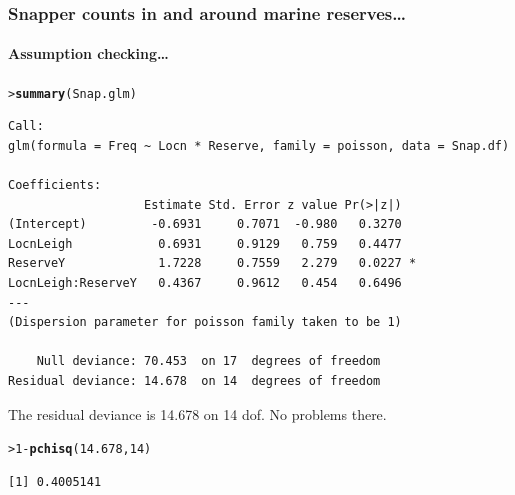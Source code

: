\documentclass{beamer}\usepackage[]{graphicx}\usepackage[]{xcolor}
\makeatletter
\newcommand{\hlnum}[1]{\textcolor[rgb]{0.686,0.059,0.569}{#1}}%
\newcommand{\hlopt}[1]{\textcolor[rgb]{0,0,0}{#1}}%
\newcommand{\hlstd}[1]{\textcolor[rgb]{0.345,0.345,0.345}{#1}}%
\newcommand{\hlkwd}[1]{\textcolor[rgb]{0.737,0.353,0.396}{\textbf{#1}}}%
\newenvironment{kframe}{%
 \def\at@end@of@kframe{}%
 \ifinner\ifhmode%
  \def\at@end@of@kframe{\end{minipage}}%
  \begin{minipage}{\columnwidth}%
 \fi\fi%
 \def\FrameCommand##1{\hskip\@totalleftmargin \hskip-\fboxsep
 \colorbox{shadecolor}{##1}\hskip-\fboxsep
     \hskip-\linewidth \hskip-\@totalleftmargin \hskip\columnwidth}%
 \MakeFramed {\advance\hsize-\width
   \@totalleftmargin\z@ \linewidth\hsize
   \@setminipage}}%
 {\par\unskip\endMakeFramed%
 \at@end@of@kframe}
\newenvironment{knitrout}{}{} %
\makeatother
\begin{document}
\begin{frame}[fragile]
\frametitle{Snapper counts in and around marine reserves\ldots}
\framesubtitle{Assumption checking\ldots}

\begin{knitrout}\scriptsize
{}\color{fgcolor}\begin{kframe}
\begin{alltt}
\hlstd{> }\hlkwd{summary}\hlstd{(Snap.glm)}
\end{alltt}
\end{kframe}
\end{knitrout}

\begin{knitrout}\scriptsize
{}\color{fgcolor}\begin{kframe}
\begin{verbatim}
Call:
glm(formula = Freq ~ Locn * Reserve, family = poisson, data = Snap.df)

Coefficients:
                   Estimate Std. Error z value Pr(>|z|)  
(Intercept)         -0.6931     0.7071  -0.980   0.3270  
LocnLeigh            0.6931     0.9129   0.759   0.4477  
ReserveY             1.7228     0.7559   2.279   0.0227 *
LocnLeigh:ReserveY   0.4367     0.9612   0.454   0.6496  
---
(Dispersion parameter for poisson family taken to be 1)

    Null deviance: 70.453  on 17  degrees of freedom
Residual deviance: 14.678  on 14  degrees of freedom
\end{verbatim}
\end{kframe}
\end{knitrout}

\medskip

The residual deviance is 14.678 on 14 dof. No problems there.

\begin{knitrout}\scriptsize
{}\color{fgcolor}\begin{kframe}
\begin{alltt}
\hlstd{> }\hlnum{1} \hlopt{-} \hlkwd{pchisq}\hlstd{(}\hlnum{14.678}\hlstd{,} \hlnum{14}\hlstd{)}
\end{alltt}
\begin{verbatim}
[1] 0.4005141
\end{verbatim}
\end{kframe}
\end{knitrout}

\end{frame}
\end{document}
